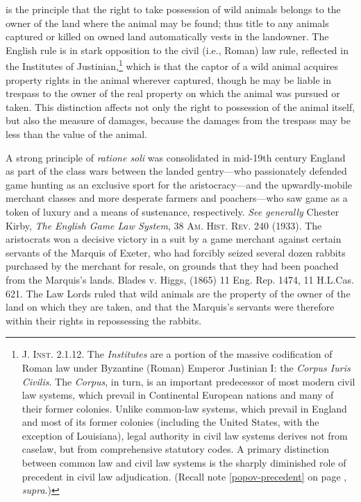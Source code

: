 

 is the principle that the right to take
possession of wild animals belongs to the owner of the land where the animal may
be found; thus title to any animals captured or killed on owned land
automatically vests in the landowner. The English rule is in stark opposition to
the civil (i.e., Roman) law rule, reflected in the Institutes of
Justinian,\footnote{\textsc{J. Inst.} 2.1.12. The \textit{Institutes} are a
portion of the massive codification of Roman law under Byzantine (Roman) Emperor
Justinian I: the \textit{Corpus Iuris Civilis}. The \textit{Corpus}, in turn, is
an important predecessor of most modern civil law systems, which prevail in
Continental European nations and many of their former colonies. Unlike
common-law systems, which prevail in England and most of its former colonies
(including the United States, with the exception of Louisiana), legal authority
in civil law systems derives not from caselaw, but from comprehensive statutory
codes. A primary distinction between common law and civil law systems is the
sharply diminished role of precedent in civil law adjudication. (Recall note
\ref{popov-precedent} on page \pageref{popov-precedent}, \textit{supra}.)}
which is that the captor of a wild animal acquires property rights in the animal
wherever captured, though he may be liable in trespass to the owner of the real
property on which the animal was pursued or taken. This distinction affects not
only the right to possession of the animal itself, but also the measure of
damages, because the damages from the trespass may be less than the value of the
animal.

A strong principle of \textit{ratione soli} was consolidated in mid-19th century
England as part of the class wars between the landed gentry---who passionately
defended game hunting as an exclusive sport for the aristocracy---and the
upwardly-mobile merchant classes and more desperate farmers and poachers---who
saw game as a token of luxury and a means of sustenance, respectively.
\textit{See generally} Chester Kirby, \emph{The English Game Law System}, 38
\textsc{Am. Hist. Rev.} 240 (1933). The aristocrats won a decisive victory in a
suit by a game merchant against certain servants of the Marquis of Exeter, who
had forcibly seized several dozen rabbits purchased by the merchant for resale,
on grounds that they had been poached from the Marquis's lands. Blades v. Higgs,
(1865) 11 Eng. Rep. 1474, 11 H.L.Cas. 621. The Law Lords ruled that wild animals
are the property of the owner of the land on which they are taken, and that the
Marquis's servants were therefore within their rights in repossessing the
rabbits.

